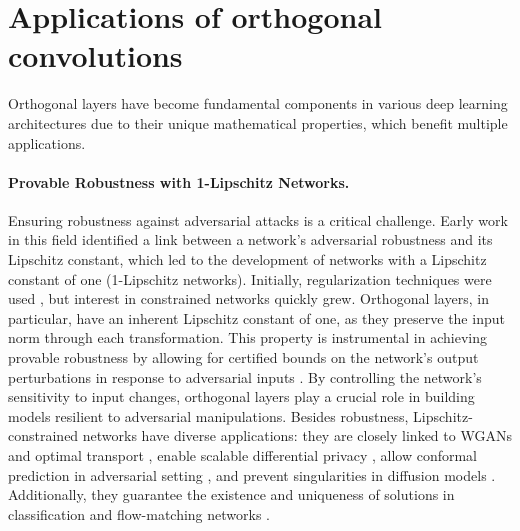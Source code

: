 \onecolumn

\tableofcontents

\section{Applications of orthogonal convolutions}\label{sec:ap_intro}

    Orthogonal layers have become fundamental components in various deep learning architectures due to their unique mathematical properties, which benefit multiple applications.
    
    \paragraph{Provable Robustness with 1-Lipschitz Networks.}
    Ensuring robustness against adversarial attacks is a critical challenge. Early work in this field \cite{szegedy_intriguing_2013} identified a link between a network's adversarial robustness and its Lipschitz constant, which led to the development of networks with a Lipschitz constant of one (1-Lipschitz networks). Initially, regularization techniques were used \cite{cisse2017parseval}, but interest in constrained networks quickly grew. Orthogonal layers, in particular, have an inherent Lipschitz constant of one, as they preserve the input norm through each transformation. This property is instrumental in achieving provable robustness by allowing for certified bounds on the network's output perturbations in response to adversarial inputs \cite{anil_sorting_2019}. By controlling the network's sensitivity to input changes, orthogonal layers play a crucial role in building models resilient to adversarial manipulations.
    Besides robustness, Lipschitz-constrained networks have diverse applications: they are closely linked to WGANs and optimal transport \cite{arjovsky2017wasserstein, bethune2024deep}, enable scalable differential privacy \cite{bethunedp}, allow conformal prediction in adversarial setting \cite{massena2025efficient}, and prevent singularities in diffusion models \cite{yang2023lipschitz}. Additionally, they guarantee the existence and uniqueness of solutions in classification \cite{bethune_pay_2022} and flow-matching networks \cite{perko2013differential, coddington1956theory}.
    

